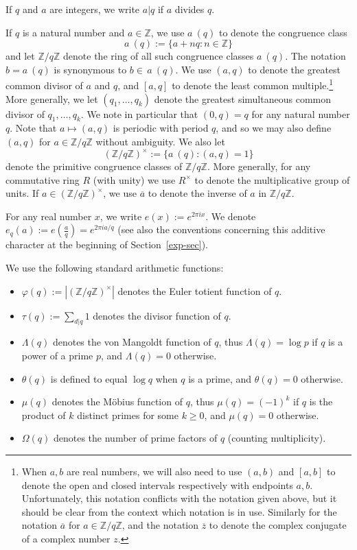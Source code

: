 \documentclass[12pt,a4paper,reqno]{amsart}
\numberwithin{equation}{section}
\theoremstyle{plain}
\theoremstyle{definition}
\newcommand\Z{\mathbb{Z}}
\renewcommand{\phi}{\varphi}
\begin{document}
If $q$ and $a$ are integers, we write $a|q$ if $a$ divides $q$. %
\par
If $q$ is a natural number and $a \in \Z$, we use $a\ (q)$ to denote
the congruence class
$$ a\ (q) := \{ a+nq: n \in \Z \}$$
and let $\Z/q\Z$ denote the ring of all such congruence classes $a\
(q)$. The notation $b=a\ (q)$ is synonymous to $b \in \, a \ (q)$. We
use $(a,q)$ to denote the greatest common divisor of $a$ and $q$, and
$[a,q]$ to denote the least common
multiple.\footnote{When $a,b$ are real numbers, we will also
  need to use $(a,b)$ and $[a,b]$ to denote the open and closed
  intervals respectively with endpoints $a,b$.  Unfortunately, this
  notation conflicts with the notation given above, but it should be
  clear from the context which notation is in use.  Similarly for the notation $\overline{a}$ for $a \in \Z/q\Z$, and the notation $\overline{z}$ to denote the complex conjugate of a complex number $z$.}
  More generally, we let $(q_1,\ldots,q_k)$ denote the
greatest simultaneous common divisor of $q_1,\ldots,q_k$.  We note in particular that $(0,q) = q$ for any natural number $q$. %
Note that $a \mapsto (a,q)$ is periodic with period $q$, and so we may
also define $(a,q)$ for $a \in\Z/q\Z$ without ambiguity.  We also let
$$ (\Z/q\Z)^\times := \{ a\ (q): (a,q)=1 \}$$
denote the primitive congruence classes of $\Z/q\Z$.  More generally,
for any commutative ring $R$ (with unity) we use $R^\times$ to denote the
multiplicative group of units.  If $a \in (\Z/q\Z)^\times$, we use $\overline{a}$ to denote the inverse of $a$ in $\Z/q\Z$.

\par
For any real number $x$, we write $e(x) := e^{2\pi i x}$.  We denote
$e_q(a):=e(\frac{a}{q}) = e^{2\pi i a/q}$ (see also the conventions
concerning this additive character at the beginning of
Section~\ref{exp-sec}).

We use the following standard arithmetic functions:
\begin{itemize}
\item[(i)] $\phi(q) := |(\Z/q\Z)^\times|$ denotes the Euler totient function of $q$.
\item[(ii)] $\tau(q) := \sum_{d|q} 1$ denotes the divisor function of $q$.
\item[(iii)] $\Lambda(q)$ denotes the von Mangoldt function of $q$, thus $\Lambda(q)=\log p$ if $q$ is a power of a prime $p$, and $\Lambda(q)=0$ otherwise.
\item[(iv)] $\theta(q)$ is defined to equal $\log q$ when $q$ is a prime, and $\theta(q)=0$ otherwise.
\item[(v)] $\mu(q)$ denotes the M\"obius function of $q$, thus $\mu(q) = (-1)^k$ if $q$ is the product of $k$ distinct primes for some $k \geq 0$, and $\mu(q)=0$ otherwise.
\item[(vi)] $\Omega(q)$ denotes the number of prime factors of $q$ (counting multiplicity).
\end{itemize}
\end{document}
